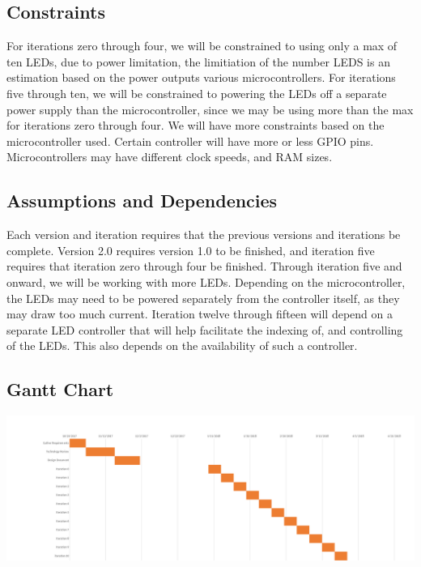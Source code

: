 \documentclass[onecolumn, draftclsnofoot,10pt, compsoc]{IEEEtran}
\begin{document}
		\subsection{Constraints}
		For iterations zero through four, we will be constrained to using only a max of ten LEDs, due to power limitation, the limitiation of the number LEDS is an estimation based on the power outputs various microcontrollers. For iterations five through ten, we will be constrained to powering the LEDs off a separate power supply than the microcontroller,
		since we may be using more than the max for iterations zero through four. We will have more constraints based on the microcontroller used. Certain controller will have more or less GPIO pins. Microcontrollers may have different clock speeds, and RAM sizes.

		\subsection{Assumptions and Dependencies}
		Each version and iteration requires that the previous versions and iterations be complete. Version 2.0 requires version 1.0 to be finished, and iteration five requires that iteration zero through four be finished.
		Through iteration five and onward, we will be working with more LEDs. Depending on the microcontroller, the LEDs may need to be powered separately from the controller itself, as they may draw too much current.
		Iteration twelve through fifteen will depend on a separate LED controller that will help facilitate the indexing of, and controlling of the LEDs. This also depends on the availability of such a controller.

		\newpage
		\begin{landscape}
		\subsection{Gantt Chart}
		\includegraphics[width=\linewidth]{Gant.png}
		\end{landscape}
		\newpage
\end{document}
